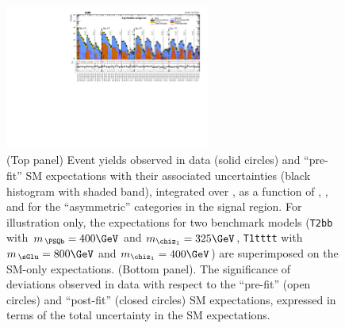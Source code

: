 \begin{figure}[!h]
  \begin{center}
    \includegraphics[angle=90,width=0.6\textwidth]{figures/result/v1/summaryPlot_Asymmetric_prefit_overlay_fit_b}
    \caption{(Top panel) Event yields observed in data (solid circles)
      and ``pre-fit'' SM expectations with their associated
      uncertainties (black histogram with shaded band), integrated
      over \HTmiss, as a function of \njet, \nb, and \scalht for the
      ``asymmetric'' \njet categories in the signal region. For
      illustration only, the expectations for two benchmark models
      (\texttt{T2bb} with $m_{\,\PSQb} = 400\GeV$ and $m_{\chiz_1} =
      325\GeV$, \texttt{T1tttt} with $m_{\,\sGlu} = 800\GeV$ and
      $m_{\chiz_1} = 400\GeV$) are superimposed on the SM-only
      expectations. (Bottom panel). The significance of deviations
      observed in data with respect to the ``pre-fit'' (open circles)
      and ``post-fit'' (closed circles) SM expectations, expressed in
      terms of the total uncertainty in the SM expectations.  }
    \label{fig:asym}
  \end{center}
\end{figure}


